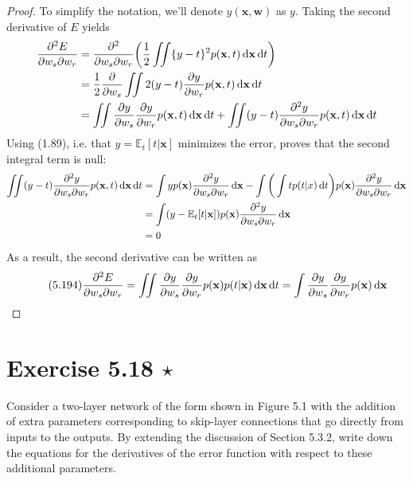 \vspace{1em}

\begin{proof}
    To simplify the notation, we'll denote $y(\mathbf{x}, \mathbf{w})$ as $y$.
    Taking the second derivative of $E$ yields
    \begin{align*}
         \pdv{E}{w_s}{w_r}
         &= \pdv{}{w_s}{w_r} \bigg(\frac{1}{2} \iint \{y - t\}^2 p(\mathbf{x}, t) \diff \mathbf{x} \diff t\bigg) \\
         &= \frac{1}{2} \pdv{w_s} \iint 2(y - t) \pdv{y}{w_r} p(\mathbf{x}, t) \diff \mathbf{x} \diff t \\
         &= \iint \pdv{y}{w_s} \pdv{y}{w_r} p(\mathbf{x}, t) \diff \mathbf{x} \diff t + 
         \iint (y - t)\pdv{y}{w_s}{w_r} p(\mathbf{x}, t) \diff \mathbf{x} \diff t
    \end{align*}
    Using (1.89), i.e. that $y = \mathbb{E}_t[t | \mathbf{x}]$
    minimizes the error, proves that the second integral term is null:
    \begin{align*}
         \iint (y - t)\pdv{y}{w_s}{w_r} p(\mathbf{x}, t) \mathop{}\!\mathrm{d} \mathbf{x} \mathop{}\!\mathrm{d} t
         &= \int y p(\mathbf{x}) \pdv{y}{w_s}{w_r} \mathop{}\!\mathrm{d} \mathbf{x}
         - \int \bigg(\int t p(t | x) \mathop{}\!\mathrm{d} t\bigg) p(\mathbf{x}) \pdv{y}{w_s}{w_r} \mathop{}\!\mathrm{d} \mathbf{x} \\
         &= \int (y - \mathbb{E}_t[t | \mathbf{x}]) p(\mathbf{x}) \pdv{y}{w_s}{w_r} \mathop{}\!\mathrm{d} \mathbf{x} \\
         &= 0
    \end{align*}
    As a result, the second derivative can be written as
    \begin{equation*} \tag{5.194}
        \pdv{E}{w_s}{w_r}
        = \iint \pdv{y}{w_s} \pdv{y}{w_r} p(\mathbf{x}) p(t | \mathbf{x}) \mathop{}\!\mathrm{d} \mathbf{x} \mathop{}\!\mathrm{d} t
        = \int  \pdv{y}{w_s} \pdv{y}{w_r} p(\mathbf{x}) \mathop{}\!\mathrm{d} \mathbf{x}
    \end{equation*}
\end{proof}

\section*{Exercise 5.18 $\star$}
Consider a two-layer network of the form shown in Figure 5.1 with the addition
of extra parameters corresponding to skip-layer connections
that go directly from inputs to the outputs. By extending the discussion of Section 5.3.2,
write down the equations for the derivatives of the error function with respect
to these additional parameters.

